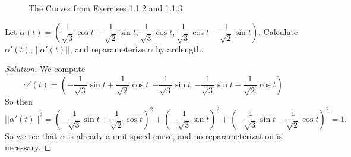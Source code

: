 \documentclass[Shifrin_Solutions_Spring_2015]{subfiles}
\begin{document}
\begin{figure}[h]
\centering
{}
  \caption{The Curves from Exercises 1.1.2 and 1.1.3}
\end{figure}





\begin{exercise} Let
$\alpha (t) = \left( \dfrac{1}{\sqrt{3}} \cos t + \dfrac{1}{\sqrt{2}}\sin t , \dfrac{1}{\sqrt{3}}\cos t , \dfrac{1}{\sqrt{3}}\cos t - \dfrac{1}{\sqrt{2}}\sin t \right)$.
Calculate $\alpha'(t)$, $|| \alpha'(t)||$, and reparameterize $\alpha$ by arclength.
\end{exercise}

\begin{proof}[Solution]
We compute
\[
\alpha'(t) = \left(  -\dfrac{1}{\sqrt{3}}\sin t + \dfrac{1}{\sqrt{2}}\cos t ,
- \dfrac{1}{\sqrt{3}} \sin t ,
-\dfrac{1}{\sqrt{3}}\sin t - \dfrac{1}{\sqrt{2}}\cos t
\right) .
\]
So then
\[
||\alpha'(t)||^2 = \left( -\dfrac{1}{\sqrt{3}}\sin t + \dfrac{1}{\sqrt{2}}\cos t \right)^2 + \left( - \dfrac{1}{\sqrt{3}} \sin t \right)^2 + \left( -\dfrac{1}{\sqrt{3}}\sin t - \dfrac{1}{\sqrt{2}}\cos t \right)^2 = 1 .
\]
So we see that $\alpha$ is already a unit speed curve, and no reparameterization is necessary.
\end{proof}
\end{document}
